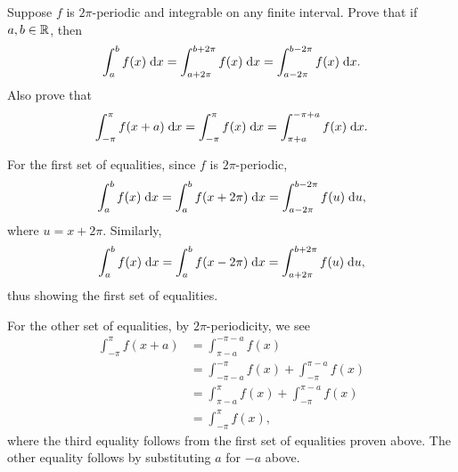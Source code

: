 \begin{exrc}[1]
    Suppose \(f\) is \(2\pi\)-periodic and integrable on any finite interval.
    Prove that if \(a, b \in \mathbb{R}\), then
    \begin{equation*}
        \int_{a}^{b} f(x) \;\mathrm d x = \int_{a + 2\pi}^{b + 2\pi} f(x) \;\mathrm d x
        = \int_{a - 2\pi}^{b - 2\pi} f(x) \;\mathrm d x.
    \end{equation*}
    Also prove that
    \begin{equation*}
        \int_{-\pi}^{\pi} f(x + a) \;\mathrm d x
        = \int_{-\pi}^{\pi} f(x) \;\mathrm d x
        = \int_{\pi + a}^{-\pi + a} f(x) \;\mathrm d x.
    \end{equation*}

\begin{soln}
    For the first set of equalities, since \(f\) is \(2\pi\)-periodic,
    \begin{equation*}
        \int_{a}^{b} f(x) \;\mathrm d x
        = \int_{a}^{b} f(x + 2\pi) \;\mathrm d x
        = \int_{a - 2\pi}^{b - 2\pi} f(u) \;\mathrm d u,
    \end{equation*}
    where \(u = x + 2\pi\).
    Similarly,
    \begin{equation*}
        \int_{a}^{b} f(x) \;\mathrm d x
        = \int_{a}^{b} f(x - 2\pi) \;\mathrm d x
        = \int_{a + 2\pi}^{b + 2\pi} f(u) \;\mathrm d u,
    \end{equation*}
    thus showing the first set of equalities.

    For the other set of equalities, by \(2\pi\)-periodicity, we see
    \begin{align*}
        \int_{-\pi}^{\pi} f(x + a)
        & = \int_{\pi - a}^{-\pi - a} f(x) \\
        & = \int_{-\pi - a}^{-\pi} f(x) + \int_{-\pi}^{\pi - a} f(x) \\
        & = \int_{\pi - a}^{\pi} f(x) + \int_{-\pi}^{\pi - a} f(x) \\
        & = \int_{-\pi}^{\pi} f(x),
    \end{align*}
    where the third equality follows from the first set of equalities proven above.
    The other equality follows by substituting \(a\) for \(-a\) above.

    


     

\end{soln}
\end{exrc}
